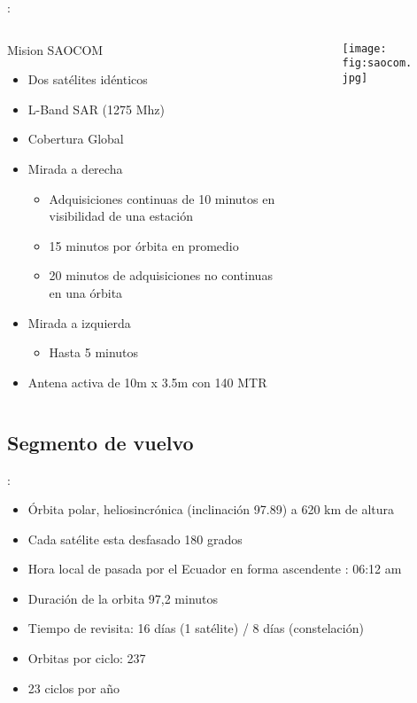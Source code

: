 \begin{frame}{\secname : \subsecname}
  \begin{columns}
    \begin{column}{0.6\textwidth}
     \begin{block}{Mision SAOCOM}
\begin{itemize}
  \item Dos satélites idénticos
  \item L-Band SAR (1275 Mhz)
  \item Cobertura Global
  \item Mirada a derecha
  \begin{itemize}
    \item Adquisiciones continuas de 10 minutos en visibilidad de una estación
    \item 15 minutos por órbita en promedio
    \item 20 minutos de adquisiciones no continuas en una órbita
  \end{itemize}
  \item Mirada a izquierda
  \begin{itemize}
    \item Hasta 5 minutos
  \end{itemize}
  \item Antena activa de 10m x 3.5m con 140 MTR
\end{itemize}
     \end{block}
    \end{column}
    \begin{column}{0.4\textwidth}  %
      \begin{figure}
        \centering
        \texttt{[image: fig:saocom.jpg]}
        \caption*{}
        \label{}
      \end{figure}
    \end{column}
    \end{columns}

\end{frame}


\subsection{Segmento de vuelvo}
\begin{frame}{\secname : \subsecname}
\begin{itemize}
  \item Órbita polar, heliosincrónica (inclinación 97.89) a 620 km de altura
  \item Cada satélite esta desfasado 180 grados
  \item Hora local de pasada por el Ecuador en forma ascendente : 06:12 am
  \item Duración de la orbita 97,2 minutos
  \item Tiempo de revisita: 16 días (1 satélite) / 8 días (constelación)
  \item Orbitas por ciclo: 237
  \item 23 ciclos por año
\end{itemize}
\end{frame}
